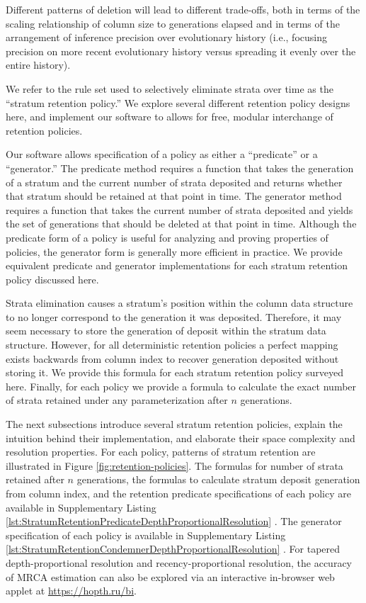 Different patterns of deletion will lead to different trade-offs, both in terms of the scaling relationship of column size to generations elapsed and in terms of the arrangement of inference precision over evolutionary history (i.e., focusing precision on more recent evolutionary history versus spreading it evenly over the entire history).

We refer to the rule set used to selectively eliminate strata over time as the ``stratum retention policy.''
We explore several different retention policy designs here, and implement our software to allows for free, modular interchange of retention policies.

Our software allows specification of a policy as either a ``predicate'' or a ``generator.''
The predicate method requires a function that takes the generation of a stratum and the current number of strata deposited and returns whether that stratum should be retained at that point in time.
The generator method requires a function that takes the current number of strata deposited and yields the set of generations that should be deleted at that point in time.
Although the predicate form of a policy is useful for analyzing and proving properties of policies, the generator form is generally more efficient in practice.
We provide equivalent predicate and generator implementations for each stratum retention policy discussed here.

Strata elimination causes a stratum's position within the column data structure to no longer correspond to the generation it was deposited.
Therefore, it may seem necessary to store the generation of deposit within the stratum data structure.
However, for all deterministic retention policies a perfect mapping exists backwards from column index to recover generation deposited without storing it.
We provide this formula for each stratum retention policy surveyed here.
Finally, for each policy we provide a formula to calculate the exact number of strata retained under any parameterization after $n$ generations.

The next subsections introduce several stratum retention policies, explain the intuition behind their implementation, and elaborate their space complexity and resolution properties.
For each policy, patterns of stratum retention are illustrated in Figure \ref{fig:retention-policies}.
The formulas for number of strata retained after $n$ generations, the formulas to calculate stratum deposit generation from column index, and the retention predicate specifications of each policy are available in Supplementary Listing \ref{lst:StratumRetentionPredicateDepthProportionalResolution} \citep{moreno2022hstratconceptsupplement}.
The generator specification of each policy is available in Supplementary Listing \ref{lst:StratumRetentionCondemnerDepthProportionalResolution} \citep{moreno2022hstratconceptsupplement}.
For tapered depth-proportional resolution and recency-proportional resolution, the accuracy of MRCA estimation can also be explored via an interactive in-browser web applet at \url{https://hopth.ru/bi}.

